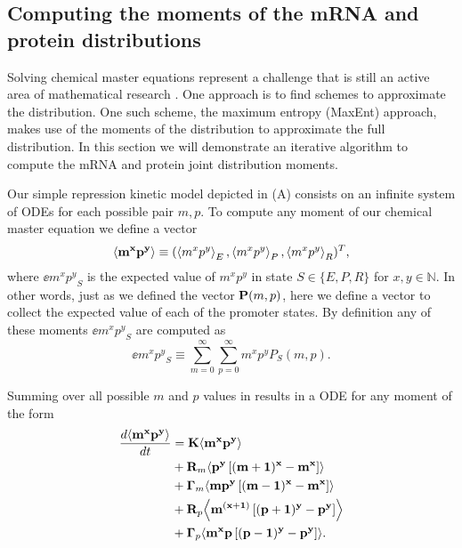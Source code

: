 \subsection{Computing the moments of the mRNA and protein distributions}

Solving chemical master equations represent a challenge that is still an active
area of mathematical research \cite{Dinh2016}. One approach is to find schemes
to approximate the distribution. One such scheme, the maximum entropy (MaxEnt)
approach, makes use of the moments of the distribution to approximate the full
distribution. In this section we will demonstrate an iterative algorithm to
compute the mRNA and protein joint distribution moments.

Our simple repression kinetic model depicted in (A)
consists on an infinite system of ODEs for each possible pair $m, p$. To
compute any moment of our chemical master equation we define a vector
\begin{equation}
	\left\langle \mathbf{m^x p^y} \right\rangle \equiv (\left\langle m^x p^y \right\rangle_E, \left\langle m^x p^y \right\rangle_P, \left\langle m^x p^y \right\rangle_R)^T,
\end{equation}
where $\ee{m^x p^y}_S$ is the expected value of $m^x p^y$ in state $S \in \{E,
P, R\}$ for $x, y \in \mathbb{N}$. In other words, just as we defined the vector
$\mathbf{P}(m, p)$, here we define a vector to collect the expected value of each of
the promoter states. By definition any of these moments $\ee{m^x p^y}_S$ are
computed as
\begin{equation}
  \ee{m^x p^y}_S \equiv \sum_{m=0}^\infty \sum_{p=0}^\infty m^x p^y P_S(m, p).
  \label{eq_mom_def}
\end{equation}

Summing over all possible $m$ and $p$ values in  results in a ODE for any moment of the form 
\begin{equation}
  \begin{aligned}
    {d{\mathbf{\left\langle m^x p^y \right\rangle}} \over dt} &=
    \mathbf{K} \mathbf{\left\langle m^x p^y \right\rangle}\\
    &+ \mathbf{R}_m \mathbf{\left\langle p^y \left[ (m + 1)^x -m^x \right] \right\rangle}\\
    &+ \mathbf{\Gamma}_m \mathbf{\left\langle m p^y \left[ (m - 1)^x - m^x \right] \right\rangle}\\
    &+ \mathbf{R}_p \mathbf{\left\langle m^{(x + 1)} \left[ (p + 1)^y - p^y \right] \right\rangle}\\
    &+ \mathbf{\Gamma}_p \mathbf{\left\langle m^x p \left[ (p - 1)^y - p^y \right] \right\rangle}.
    \label{eq_gral_mom}
  \end{aligned}
\end{equation}

